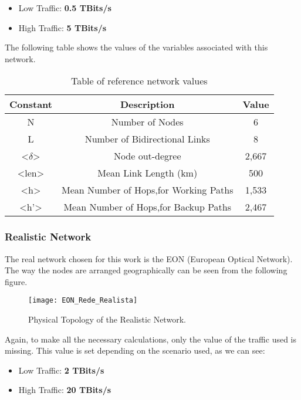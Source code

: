 \begin{itemize}
  \item Low Traffic: \textbf{0.5 TBits/s}
  \item High Traffic: \textbf{5 TBits/s}
\end{itemize}

\begin{table}[h!]
The following table shows the values of the variables associated with this network.\vspace{10pt}
\centering
\begin{tabular}{|| c | c | c||}
 \hline
 Constant & Description & Value \\
 \hline\hline
 N & Number of Nodes & 6 \\
 L & Number of Bidirectional Links & 8 \\
 <$\delta$> & Node out-degree & 2,667 \\
 <len> & Mean Link Length (km) & 500 \\
 <h> & Mean Number of Hops,for Working Paths & 1,533 \\
 <h'> & Mean Number of Hops,for Backup Paths & 2,467 \\
 \hline
\end{tabular}
\caption{Table of reference network values}
\label{table:1}
\end{table}



\subsubsection{Realistic Network}
The real network chosen for this work is the EON (European Optical Network).
The way the nodes are arranged geographically can be seen from the following figure.

\begin{figure}[h!]
\centering
\texttt{[image: EON\_Rede\_Realista]}
\caption{Physical Topology of the Realistic Network.}
\end{figure}

\vspace{10pt}

Again, to make all the necessary calculations, only the value of the traffic used is missing. This value is set depending on the scenario used, as we can see:

\begin{itemize}
  \item Low Traffic: \textbf{2 TBits/s}
  \item High Traffic: \textbf{20 TBits/s}
\end{itemize}

